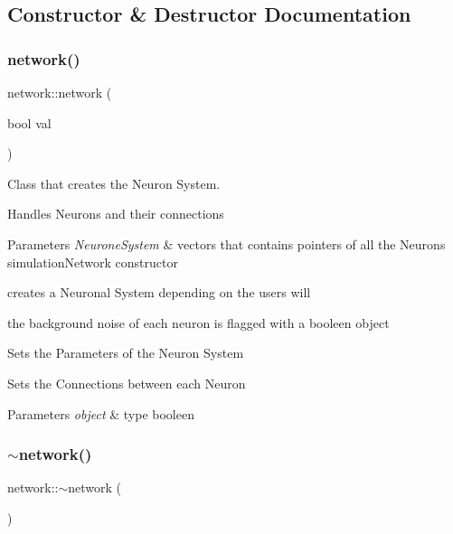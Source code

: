 \subsection{Constructor \& Destructor Documentation}
\mbox{\label{classnetwork_aac44f197a402ad67d1e7b266221bcca4}} 
\subsubsection{\texorpdfstring{network()}{network()}}
{\footnotesize\ttfamily network\+::network (\begin{DoxyParamCaption}\item[{bool}]{val }\end{DoxyParamCaption})}



Class that creates the Neuron System. 

Handles Neurons and their connections


\begin{DoxyParams}{Parameters}
{\em Neurone\+System} & vectors that contains pointers of all the Neurons simulation\+Network constructor\\
\hline
\end{DoxyParams}
creates a Neuronal System depending on the user\textquotesingle{}s will

the background noise of each neuron is flagged with a booleen object

Sets the Parameters of the Neuron System

Sets the Connections between each Neuron 
\begin{DoxyParams}{Parameters}
{\em object} & type booleen \\
\hline
\end{DoxyParams}
\mbox{\label{classnetwork_a37b843338509d5a411b3efe2b702da15}} 
\subsubsection{\texorpdfstring{$\sim$network()}{~network()}}
{\footnotesize\ttfamily network\+::$\sim$network (\begin{DoxyParamCaption}{ }\end{DoxyParamCaption})}



